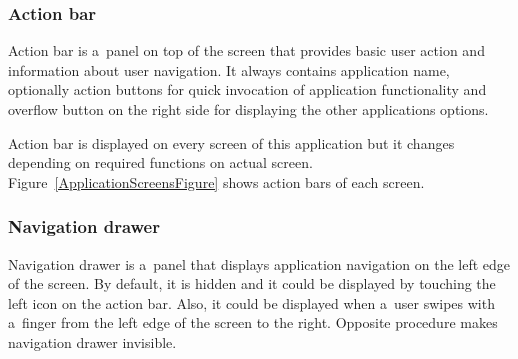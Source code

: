 \subsubsection{Action bar}
Action bar is a~panel on top of the screen that provides basic user action and information about user navigation. It
always contains application name, optionally action buttons for quick invocation of application functionality and
overflow button on the right side for displaying the other applications options.

Action bar is displayed on every screen of this application but it changes depending on required functions on actual
screen. Figure~\ref{ApplicationScreensFigure} shows action bars of each screen.

\subsubsection{Navigation drawer}
Navigation drawer is a~panel that displays application navigation on the left edge of the screen. By default, it is
hidden and it could be displayed by touching the left icon on the action bar. Also, it could be displayed when a~user
swipes with a~finger from the left edge of the screen to the right. Opposite procedure makes navigation drawer
invisible.


